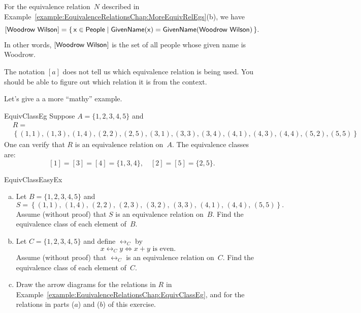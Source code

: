 \begin{example}{}
For the equivalence relation~$N$ described in Example~\ref{example:EquivalenceRelationsChap:MoreEquivRelEgs}(b), we have
	$$ [\sf{Woodrow\,\,Wilson}] = \{\, x \in \sf{People} \mid \sf{GivenName}(x) = \sf{GivenName}(\sf{Woodrow\,\,Wilson}) \,\} .$$
In other words, $[\sf{Woodrow\,\,Wilson}]$ is the set of all people whose given name is Woodrow.
\end{example}

\begin{warn}
The notation $[a]$ does not tell us which equivalence relation is being used. You should be able to figure out which relation it is from the context.
\end{warn}

Let's give a a more ``mathy'' example.

\begin{example}{EquivClassEg}
Suppose $A = \{1,2,3,4,5\}$ and 
\begin{align*}
&R = \\
&\left\{  (1,1), (1,3), (1,4), (2,2), (2,5), (3,1), (3,3), 
		(3,4), (4,1), (4,3), (4,4), (5,2), (5,5) 
\right\}
\end{align*}
One can verify that $R$ is an equivalence relation on~$A$. The equivalence classes are:
$$ [1] = [3] = [4] = \{1,3,4\},
\quad [2] = [5] = \{2,5\}.$$
\end{example}

\begin{exercise}{EquivClassEasyEx}
\begin{enumerate}[(a)]
\item \label{EquivClassEasyEx-set}
Let $B = \{1,2,3,4,5\}$ and 
	$$S = \left\{ (1,1),\, (1,4),\, (2,2),\, (2,3),\, (3,2),\, 
		(3,3),\, (4,1),\, (4,4),\, (5,5)
		 \right\} .$$
Assume (without proof) that $S$ is an equivalence relation on~$B$. Find the equivalence class of each element of~$B$.


\item \label{EquivClassEasyEx-x+y}
Let $C = \{1,2,3,4,5\}$ and define $\rel_C$ by 
\[ x \rel_C y \iff x + y \text{ is even.} \]
Assume (without proof) that $\rel_C$ is an equivalence relation on~$C$. Find the equivalence class of each element of~$C$.
\item
Draw the arrow diagrams for the relations in $R$ in Example~\ref{example:EquivalenceRelationsChap:EquivClassEg}, and for the relations in parts ($a$) and ($b$) of this exercise.
\end{enumerate}
\end{exercise}


